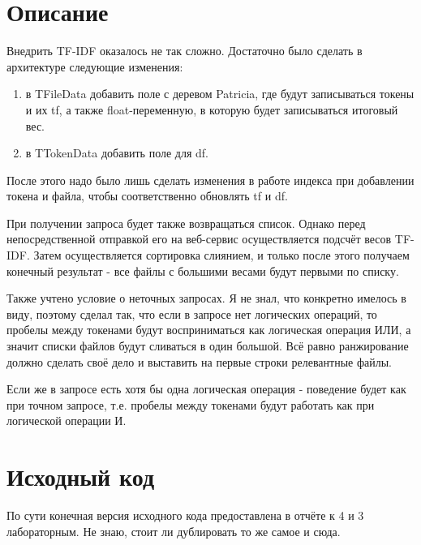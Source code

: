 \section{Описание}

Внедрить TF-IDF оказалось не так сложно. Достаточно было сделать в архитектуре следующие изменения:
\begin{enumerate}
    \item в TFileData добавить поле с деревом Patricia, где будут записываться токены и их tf, а также float-переменную, в которую будет записываться итоговый вес.
    \item в TTokenData добавить поле для df.
\end{enumerate}

После этого надо было лишь сделать изменения в работе индекса при добавлении токена и файла, чтобы соответственно обновлять tf и df.

При получении запроса будет также возвращаться список. Однако перед непосредственной отправкой его на веб-сервис осуществляется подсчёт весов TF-IDF. Затем осуществляется сортировка слиянием, и только после этого получаем конечный результат - все файлы с большими весами будут первыми по списку.

Также учтено условие о неточных запросах. Я не знал, что конкретно имелось в виду, поэтому сделал так, что если в запросе нет логических операций, то пробелы между токенами будут восприниматься как логическая операция ИЛИ, а значит списки файлов будут сливаться в один большой. Всё равно ранжирование должно сделать своё дело и выставить на первые строки релевантные файлы.

Если же в запросе есть хотя бы одна логическая операция - поведение будет как при точном запросе, т.е. пробелы между токенами будут работать как при логической операции И.

\pagebreak

\section{Исходный код}

По сути конечная версия исходного кода предоставлена в отчёте к 4 и 3 лабораторным. Не знаю, стоит ли дублировать то же самое и сюда.